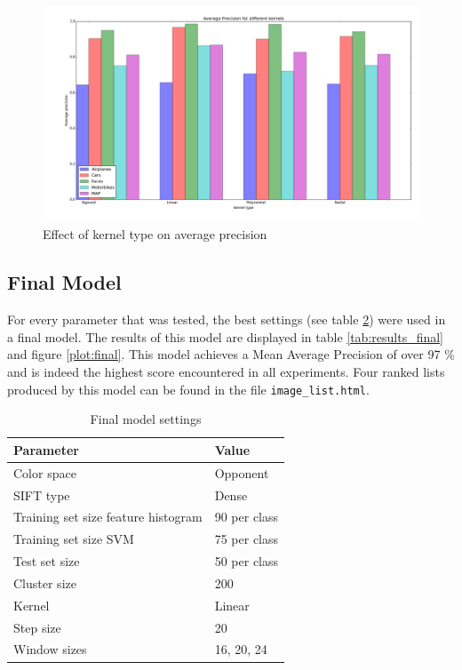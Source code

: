 \begin{table}[H]
\begin{center}
\begin{figure}[H]
\includegraphics[width=\textwidth]{../plots/kernels}
\caption{Effect of kernel type on average precision}
\label{plot:kernels}
\end{figure}


\subsection{Final Model}
For every parameter that was tested, the best settings (see table \ref{tab:final}) were used in a final model. The results of this model are displayed in table \ref{tab:results_final} and figure \ref{plot:final}. This model achieves a Mean Average Precision of over 97 \% and is indeed the highest score encountered in all experiments. Four ranked lists produced by this model can be found in the file \verb|image_list.html|.
 
\begin{table}[H]
\begin{center}
\begin{tabular}{|l|l|}
\hline
\textbf{Parameter} & \textbf{Value}\\
\hline
Color space & Opponent\\
SIFT type & Dense\\
Training set size feature histogram & 90 per class\\
Training set size SVM & 75 per class\\
Test set size & 50 per class \\
Cluster size & 200 \\
Kernel & Linear \\
Step size & 20\\
Window sizes & 16, 20, 24\\
\hline
\end{tabular}
\caption{Final model settings}
\label{tab:final}
\end{center}
\end{table}


\end{center}
\end{table}
